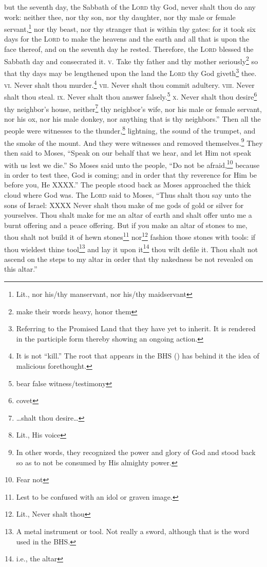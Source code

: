 \begin{enumerate}
     but the seventh day, the Sabbath of the \textsc{Lord} thy God, never shalt thou do any work: neither thee, nor thy son, nor thy daughter, nor thy male or female servant,\footnote{Lit., nor his/thy manservant, nor his/thy maidservant} nor thy beast, nor thy stranger that is within thy gates:%
     for it took six days for the \textsc{Lord} to make the heavens and the earth and all that is upon the face thereof, and on the seventh day he rested. Therefore, the \textsc{Lord} blessed the Sabbath day and consecrated it.%
     \textsc{v.} Take thy father and thy mother seriously\footnote{make their words heavy, honor them} so that thy days may be lengthened upon the land the \textsc{Lord} thy God giveth\footnote{Referring to the Promised Land that they have yet to inherit. It is rendered in the participle form thereby showing an ongoing action.} thee.%
     \textsc{vi.} Never shalt thou murder.\footnote{It is not ``kill.'' The root that appears in the BHS () has behind it the idea of malicious forethought.}%
     \textsc{vii.} Never shalt thou commit adultery.%
     \textsc{viii.} Never shalt thou steal.%
     \textsc{ix.} Never shalt thou answer falsely.\footnote{bear false witness/testimony}%
     \textsc{x.} Never shalt thou desire\footnote{covet} thy neighbor's house, neither\footnote{\dots shalt thou desire\dots} thy neighbor's wife, nor his male or female servant, nor his ox, nor his male donkey, nor anything that is thy neighbors.''%
     Then all the people were witnesses to the thunder,\footnote{Lit., His voice} lightning, the sound of the trumpet, and the smoke of the mount. And they were witnesses and removed themselves.\footnote{In other words, they recognized the power and glory of God and stood back so as to not be consumed by His almighty power.}%
     They then said to Moses, ``Speak on our behalf that we hear, and let Him not speak with us lest we die.''%
     So Moses said unto the people, ``Do not be afraid,\footnote{Fear not} because in order to test thee, God is coming; and in order that thy reverence for Him be before you, He XXXX.''%
     The people stood back as Moses approached the thick cloud where God was.%
     The \textsc{Lord} said to Moses, ``Thus shalt thou say unto the sons of Israel: XXXX%
     Never shalt thou make of me gods of gold or silver for yourselves.%
     Thou shalt make for me an altar of earth and shalt offer unto me a burnt offering and a peace offering.%
     But if you make an altar of stones to me, thou shalt not build it of hewn stones\footnote{Lest to be confused with an idol or graven image.} nor\footnote{Lit., Never shalt thou} fashion those stones with tools: if thou wieldest thine tool\footnote{A metal instrument or tool. Not really a sword, although that is the word used in the BHS.} and lay it upon it\footnote{i.e., the altar} thou wilt defile it.%
     Thou shalt not ascend on the steps to my altar in order that thy nakedness be not revealed on this altar.''%
\end{enumerate}
